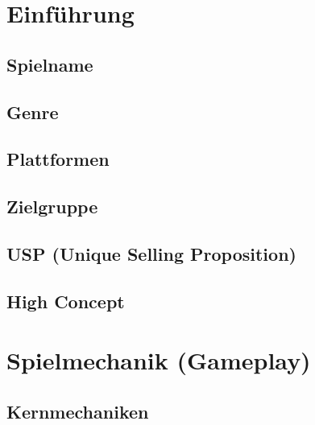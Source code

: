 \documentclass[11pt, a4paper]{article} %
\begin{document}
\tableofcontents            %
\newpage


\section{Einführung}
\subsection{Spielname}
\subsection{Genre}
\subsection{Plattformen}
\subsection{Zielgruppe}
\subsection{USP (Unique Selling Proposition)}
\subsection{High Concept}

\newpage

\section{Spielmechanik (Gameplay)}
\subsection{Kernmechaniken}
\end{document}
